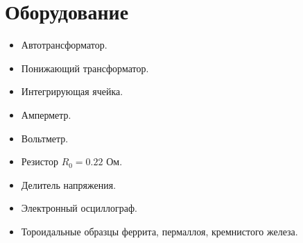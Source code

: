 \section*{Оборудование}

\begin{itemize}[itemsep = 0pt, parsep=0pt]
	
	\item Автотрансформатор.

	\item Понижающий трансформатор.
	
	\item Интегрирующая ячейка.
	
	\item Амперметр.
	
	\item Вольтметр.
	
	\item Резистор $R_0 = 0.22$ Ом.
	
	\item Делитель напряжения.
	
	\item Электронный осциллограф.
	
	\item Тороидальные образцы феррита, пермаллоя, кремнистого железа.
\end{itemize}